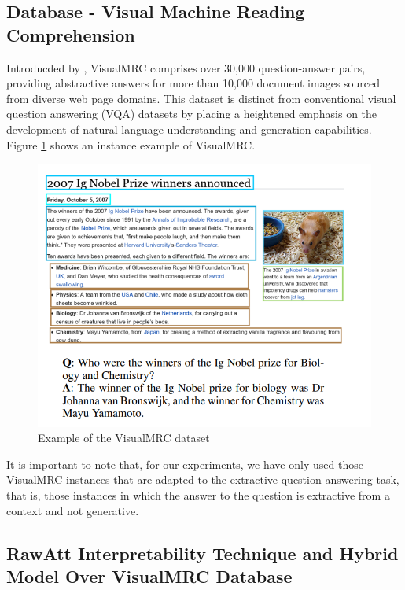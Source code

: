 \subsection{Database - Visual Machine Reading Comprehension}
\label{Database}


Introducded by \cite{visualmrc}, VisualMRC comprises over 30,000 question-answer pairs, providing abstractive answers for more than 10,000 document images sourced from diverse web page domains. This dataset is distinct from conventional visual question answering (VQA) datasets by placing a heightened emphasis on the development of natural language understanding and generation capabilities. Figure \ref{fig:visualmrc} shows an instance example of VisualMRC.

\newpage


\begin{figure}[h!]
    \centering%
    \includegraphics[width=\linewidth]{Figures/Preliminares/visualmrc_example.png}
    \caption{Example of the VisualMRC dataset \cite{visualmrc}}
    \label{fig:visualmrc}
\end{figure}


It is important to note that, for our experiments, we have only used those VisualMRC instances that are adapted to the  extractive question answering  task, that is, those instances in which the answer to the question is extractive from a context and not generative.

\newpage

\subsection{RawAtt Interpretability Technique and Hybrid Model Over VisualMRC Database}

